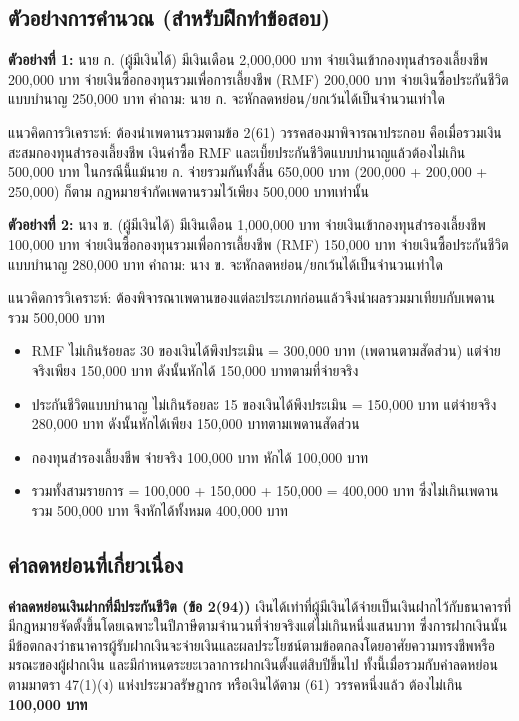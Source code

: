 \documentclass[12pt,a4paper]{article}
\newcommand{\hilight}[1]{\textbf{#1}}
\begin{document}
\subsection*{ตัวอย่างการคำนวณ (สำหรับฝึกทำข้อสอบ)}

\textbf{ตัวอย่างที่ 1:} นาย ก. (ผู้มีเงินได้) มีเงินเดือน 2,000,000 บาท จ่ายเงินเข้ากองทุนสำรองเลี้ยงชีพ 200,000 บาท จ่ายเงินซื้อกองทุนรวมเพื่อการเลี้ยงชีพ (RMF) 200,000 บาท จ่ายเงินซื้อประกันชีวิตแบบบำนาญ 250,000 บาท คำถาม: นาย ก. จะหักลดหย่อน/ยกเว้นได้เป็นจำนวนเท่าใด

แนวคิดการวิเคราะห์: ต้องนำเพดานรวมตามข้อ 2(61) วรรคสองมาพิจารณาประกอบ คือเมื่อรวมเงินสะสมกองทุนสำรองเลี้ยงชีพ เงินค่าซื้อ RMF และเบี้ยประกันชีวิตแบบบำนาญแล้วต้องไม่เกิน 500,000 บาท ในกรณีนี้แม้นาย ก. จ่ายรวมกันทั้งสิ้น 650,000 บาท (200,000 + 200,000 + 250,000) ก็ตาม กฎหมายจำกัดเพดานรวมไว้เพียง 500,000 บาทเท่านั้น

\textbf{ตัวอย่างที่ 2:} นาง ข. (ผู้มีเงินได้) มีเงินเดือน 1,000,000 บาท จ่ายเงินเข้ากองทุนสำรองเลี้ยงชีพ 100,000 บาท จ่ายเงินซื้อกองทุนรวมเพื่อการเลี้ยงชีพ (RMF) 150,000 บาท จ่ายเงินซื้อประกันชีวิตแบบบำนาญ 280,000 บาท คำถาม: นาง ข. จะหักลดหย่อน/ยกเว้นได้เป็นจำนวนเท่าใด

แนวคิดการวิเคราะห์: ต้องพิจารณาเพดานของแต่ละประเภทก่อนแล้วจึงนำผลรวมมาเทียบกับเพดานรวม 500,000 บาท
\begin{itemize}
    \item RMF ไม่เกินร้อยละ 30 ของเงินได้พึงประเมิน = 300,000 บาท (เพดานตามสัดส่วน) แต่จ่ายจริงเพียง 150,000 บาท ดังนั้นหักได้ 150,000 บาทตามที่จ่ายจริง
    \item ประกันชีวิตแบบบำนาญ ไม่เกินร้อยละ 15 ของเงินได้พึงประเมิน = 150,000 บาท แต่จ่ายจริง 280,000 บาท ดังนั้นหักได้เพียง 150,000 บาทตามเพดานสัดส่วน
    \item กองทุนสำรองเลี้ยงชีพ จ่ายจริง 100,000 บาท หักได้ 100,000 บาท
    \item รวมทั้งสามรายการ = 100,000 + 150,000 + 150,000 = 400,000 บาท ซึ่งไม่เกินเพดานรวม 500,000 บาท จึงหักได้ทั้งหมด 400,000 บาท
\end{itemize}

\subsection*{ค่าลดหย่อนที่เกี่ยวเนื่อง}

\textbf{ค่าลดหย่อนเงินฝากที่มีประกันชีวิต (ข้อ 2(94))} เงินได้เท่าที่ผู้มีเงินได้จ่ายเป็นเงินฝากไว้กับธนาคารที่มีกฎหมายจัดตั้งขึ้นโดยเฉพาะในปีภาษีตามจำนวนที่จ่ายจริงแต่ไม่เกินหนึ่งแสนบาท ซึ่งการฝากเงินนั้นมีข้อตกลงว่าธนาคารผู้รับฝากเงินจะจ่ายเงินและผลประโยชน์ตามข้อตกลงโดยอาศัยความทรงชีพหรือมรณะของผู้ฝากเงิน และมีกำหนดระยะเวลาการฝากเงินตั้งแต่สิบปีขึ้นไป ทั้งนี้เมื่อรวมกับค่าลดหย่อนตามมาตรา 47(1)(ง) แห่งประมวลรัษฎากร หรือเงินได้ตาม (61) วรรคหนึ่งแล้ว ต้องไม่เกิน \hilight{100,000 บาท}
\end{document}
